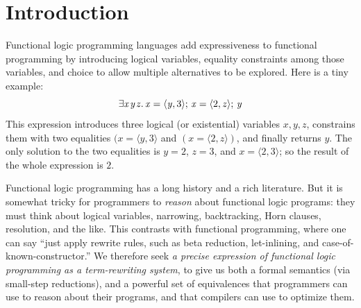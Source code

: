 \documentclass[acmsmall,review,anonymous,dvipsnames]{acmart}
\newcommand{\Varid}[1]{\mathit{#1}}
\newcommand{\eg}{\emph{e.g.}}
\begin{document}
\maketitle


\section{Introduction}

Functional logic programming languages add expressiveness to functional programming
by introducing logical variables, equality constraints among those variables,
and choice to allow multiple alternatives to be explored.  Here is a tiny example:
$$
\ensuremath{\exists\Varid{x}\hspace{0.3mm}\Varid{y}\hspace{0.3mm}\Varid{z}.\,\Varid{x}\mathrel{=}\langle{}\Varid{y},\mathrm{3}\rangle;\,\Varid{x}\mathrel{=}\langle{}\mathrm{2},\Varid{z}\rangle;\,\Varid{y}}
$$
This expression introduces three logical (or existential) variables \ensuremath{\Varid{x},\Varid{y},\Varid{z}},
constrains them with two equalities \ensuremath{(\Varid{x}\mathrel{=}\langle{}\Varid{y},\mathrm{3}\rangle} and \ensuremath{(\Varid{x}\mathrel{=}\langle{}\mathrm{2},\Varid{z}\rangle)}, and finally returns \ensuremath{\Varid{y}}.
The only solution to the two equalities is \ensuremath{\Varid{y}\mathrel{=}\mathrm{2}}, \ensuremath{\Varid{z}\mathrel{=}\mathrm{3}}, and \ensuremath{\Varid{x}\mathrel{=}\langle{}\mathrm{2},\mathrm{3}\rangle}; so the result of the
whole expression is \ensuremath{\mathrm{2}}.

Functional logic programming has a long history and a rich literature.
But it is somewhat tricky for programmers to \emph{reason} about
functional logic programs: they must think about logical variables,
narrowing, backtracking, Horn clauses, resolution, and the like.  This
contrasts with functional programming, where one can say ``just apply
rewrite rules, such as beta reduction, let-inlining, and
case-of-known-constructor.''
We therefore seek \emph{a precise expression of functional logic programming as
a term-rewriting system}, to give us both a formal semantics (via small-step reductions),
and a powerful set of equivalences that programmers can use to reason about their programs,
and that compilers can use to optimize them.
\end{document}
